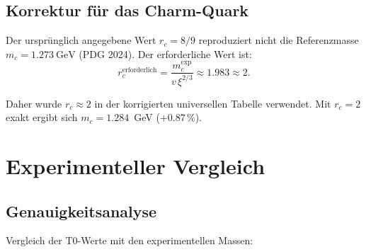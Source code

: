 \subsection{Korrektur für das Charm-Quark}
\label{subsec:charm_correction}

Der ursprünglich angegebene Wert $r_c=8/9$ reproduziert nicht die Referenzmasse $m_c=1.273\ \mathrm{GeV}$ (PDG 2024). Der erforderliche Wert ist:
\[
r_c^{\text{erforderlich}}=\frac{m_c^{\text{exp}}}{v\,\xi^{2/3}}\approx 1.983 \approx 2.
\]

Daher wurde $r_c \approx 2$ in der korrigierten universellen Tabelle verwendet. Mit $r_c = 2$ exakt ergibt sich $m_c = 1.284$~GeV ($+0.87\,\%$).


\section{Experimenteller Vergleich}
\label{sec:comprehensive_validation}

\subsection{Genauigkeitsanalyse}
\label{subsec:complete_accuracy}

Vergleich der T0-Werte mit den experimentellen Massen:

